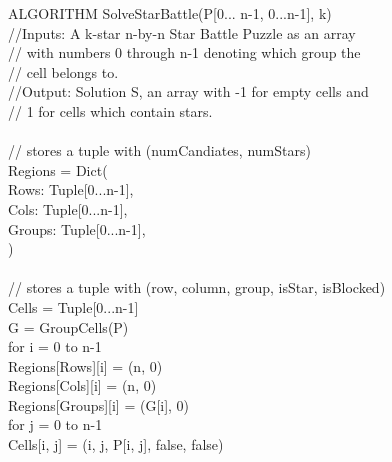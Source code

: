 \documentclass{article}
\newcommand\tab[1][0.5cm]{\hspace*{#1}}
\begin{document}
ALGORITHM SolveStarBattle(P[0... n-1, 0...n-1], k) \\
//Inputs: A k-star n-by-n Star Battle Puzzle as an array \\
//  with numbers 0 through n-1 denoting which group the  \\
//  cell belongs to. \\
//Output: Solution S, an array with -1 for empty cells and \\
//  1 for cells which contain stars. \\ \\
// stores a tuple with (numCandiates, numStars) \\
Regions = Dict( \\
\tab Rows: Tuple[0...n-1], \\
\tab Cols: Tuple[0...n-1], \\
\tab Groups: Tuple[0...n-1], \\
) \\ \\
// stores a tuple with (row, column, group, isStar, isBlocked) \\
Cells = Tuple[0...n-1] \\
G = GroupCells(P) \\
for i = 0 to n-1 \\
\tab Regions[Rows][i] = (n, 0) \\
\tab Regions[Cols][i] = (n, 0) \\
\tab Regions[Groups][i] = (G[i], 0) \\
\tab for j = 0 to n-1 \\
\tab\tab Cells[i, j] = (i, j, P[i, j], false, false) \\
\end{document}
